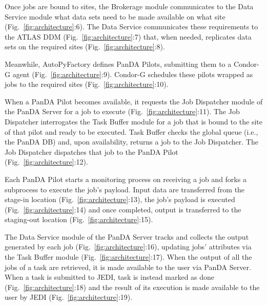 Once jobs are bound to sites, the Brokerage module communicates to the Data
Service module what data sets need to be made available on what site
(Fig.~\ref{fig:architecture}:6). The Data Service communicates these
requirements to the ATLAS DDM (Fig.~\ref{fig:architecture}:7) that, when
needed, replicates data sets on the required sites
(Fig.~\ref{fig:architecture}:8).

Meanwhile, AutoPyFactory defines PanDA Pilots, submitting them to a Condor-G
agent (Fig.~\ref{fig:architecture}:9). Condor-G schedules these pilots
wrapped as jobs to the required sites
(Fig.~\ref{fig:architecture}:10).

When a PanDA Pilot becomes available, it requests the Job Dispatcher module
of the PanDA Server for a job to execute (Fig.~\ref{fig:architecture}:11).
The Job Dispatcher interrogates the Task Buffer module for a job that is
bound to the site of that pilot and ready to be executed. Task Buffer checks
the global queue (i.e., the PanDA DB) and, upon availability, returns a job
to the Job Dispatcher. The Job Dispatcher dispatches that job to the PanDA
Pilot (Fig.~\ref{fig:architecture}:12).

Each PanDA Pilot starts a monitoring process on receiving a job and forks a
subprocess to execute the job's payload. Input data are transferred from the
stage-in location (Fig.~\ref{fig:architecture}:13), the job's payload is
executed (Fig.~\ref{fig:architecture}:14) and once completed, output is
transferred to the staging-out location (Fig.~\ref{fig:architecture}:15).

The Data Service module of the PanDA Server tracks and collects the output
generated by each job (Fig.~\ref{fig:architecture}:16), updating jobs'
attributes via the Task Buffer module (Fig.~\ref{fig:architecture}:17). When
the output of all the jobs of a task are retrieved, it is made available to
the user via PanDA Server. When a task is submitted to JEDI, task is instead
marked as done (Fig.~\ref{fig:architecture}:18) and the result of its
execution is made available to the user by JEDI
(Fig.~\ref{fig:architecture}:19).

